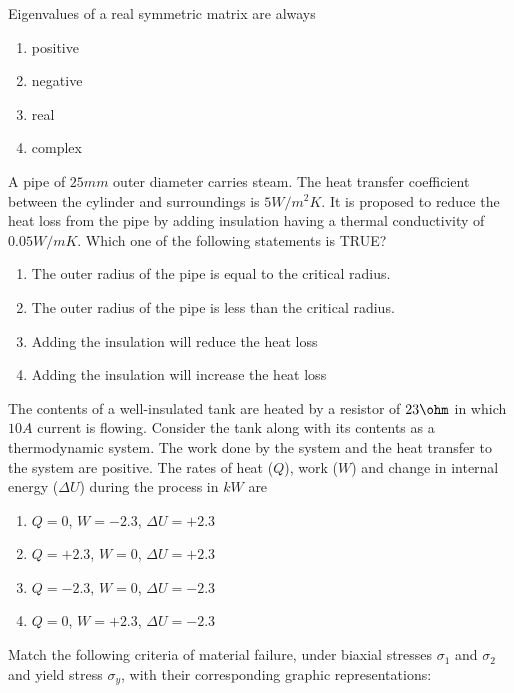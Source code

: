 \iffalse	
	\chapter{2011}
	\author{AI24BTECH11016}
	\section{me}
\fi
\item
	Eigenvalues of a real symmetric matrix are always
		\begin{enumerate}
			\item positive
			\item negative
			\item real
			\item complex
		\end{enumerate}
	\item
	A pipe of $25 mm$ outer diameter carries steam. The heat transfer coefficient between the cylinder and surroundings is $5 W/m^{2}K$. It is proposed to reduce the heat loss from the pipe by adding insulation having a thermal conductivity of $0.05 W/mK$. Which one of the following statements is TRUE?
		\begin{enumerate}
			\item The outer radius of the pipe is equal to the critical radius.
			\item The outer radius of the pipe is less than the critical radius.
			\item Adding the insulation will reduce the heat loss
			\item Adding the insulation will increase the heat loss
		\end{enumerate}
	\item
	The contents of a well-insulated tank are heated by a resistor of $23 \ohm$ in which $10 A$ current is flowing. Consider the tank along with its contents as a thermodynamic system. The work done by the system and the heat transfer to the system are positive. The rates of heat ($Q$), work ($W$) and change in internal energy ($\Delta U$) during the process in $kW$ are
		\begin{enumerate}	
			\item $Q=0$, $W=-2.3$, $\Delta U = +2.3$
			\item $Q=+2.3$, $W=0$, $\Delta U = +2.3$
			\item $Q=-2.3$, $W=0$, $\Delta U = -2.3$
			\item $Q=0$, $W=+2.3$, $\Delta U = -2.3$
		\end{enumerate}
	\item
	Match the following criteria of material failure, under biaxial stresses $\sigma_{1}$ and $\sigma_{2}$ and yield stress $\sigma_{y}$, with their corresponding graphic representations:

